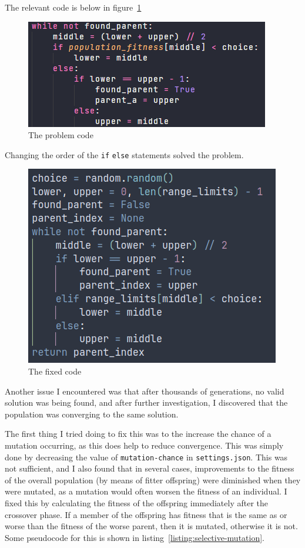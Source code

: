 The relevant code is below in figure~\ref*{fig:code-2}
\begin{figure}[ht]
	\centering
	\includegraphics[scale=0.7]{images/binary-search-3}
	\caption{The problem code}
	\label{fig:code-2}
\end{figure}

Changing the order of the \verb|if| \verb|else| statements solved the problem.
\begin{figure}[ht]
	\centering
	\includegraphics[scale=0.4]{images/binary-search-5}
	\caption{The fixed code}
	\label{fig:code-3}
\end{figure}

\newpage

Another issue I encountered was that after thousands of generations, no valid 
solution was being found, and after further investigation, I discovered that the
population was converging to the same solution.

The first thing I tried doing to fix this was to the increase the chance of a
mutation occurring, as this does help to reduce convergence. 
This was simply done by decreasing the value of \verb|mutation-chance| in 
\verb|settings.json|.
This was not sufficient, and I also found that in several cases, improvements to
the fitness of the overall population (by means of fitter offspring) were 
diminished when they were mutated, as a mutation would often worsen the fitness 
of an individual.
I fixed this by calculating the fitness of the offspring immediately after the 
crossover phase.
If a member of the offspring has fitness that is the same as or worse than the
fitness of the worse parent, then it is mutated, otherwise it is not.
Some pseudocode for this is shown in listing~\ref*{listing:selective-mutation}.


